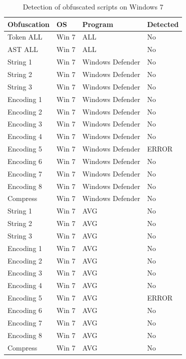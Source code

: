 \documentclass{article}%
\begin{document}
\begin{table}[]
\caption {Detection of obfuscated scripts on Windows 7} \label{tab:table_three}
\begin{center}
\begin{tabular}{|l|l|l|l|}
\hline
Obfuscation & OS    & Program          & Detected \\ \hline
Token ALL   & Win 7 & ALL              & No       \\ \hline
AST ALL     & Win 7 & ALL              & No       \\ \hline
String 1    & Win 7 & Windows Defender & No       \\ \hline
String 2    & Win 7 & Windows Defender & No       \\ \hline
String 3    & Win 7 & Windows Defender & No       \\ \hline
Encoding 1  & Win 7 & Windows Defender & No       \\ \hline
Encoding 2  & Win 7 & Windows Defender & No       \\ \hline
Encoding 3  & Win 7 & Windows Defender & No       \\ \hline
Encoding 4  & Win 7 & Windows Defender & No       \\ \hline
Encoding 5  & Win 7 & Windows Defender & ERROR    \\ \hline
Encoding 6  & Win 7 & Windows Defender & No       \\ \hline
Encoding 7  & Win 7 & Windows Defender & No       \\ \hline
Encoding 8  & Win 7 & Windows Defender & No       \\ \hline
Compress    & Win 7 & Windows Defender & No       \\ \hline
String 1    & Win 7 & AVG              & No       \\ \hline
String 2    & Win 7 & AVG              & No       \\ \hline
String 3    & Win 7 & AVG              & No       \\ \hline
Encoding 1  & Win 7 & AVG              & No       \\ \hline
Encoding 2  & Win 7 & AVG              & No       \\ \hline
Encoding 3  & Win 7 & AVG              & No       \\ \hline
Encoding 4  & Win 7 & AVG              & No       \\ \hline
Encoding 5  & Win 7 & AVG              & ERROR    \\ \hline
Encoding 6  & Win 7 & AVG              & No       \\ \hline
Encoding 7  & Win 7 & AVG              & No       \\ \hline
Encoding 8  & Win 7 & AVG              & No       \\ \hline
Compress    & Win 7 & AVG              & No       \\ \hline
\end{tabular}
\end{center}
\end{table}
\end{document}
